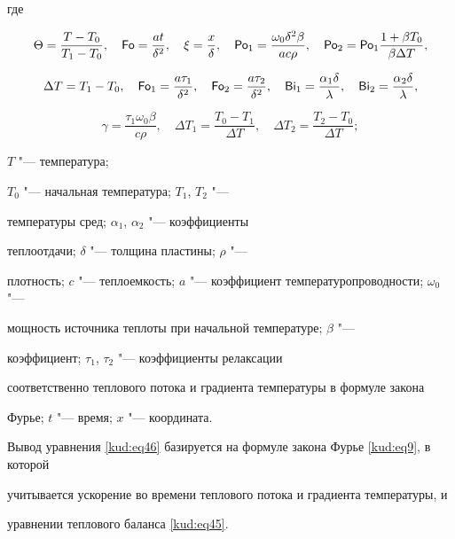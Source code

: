 где 

$$

\Theta =\frac{T-T_0 }{T_{1} -T_0}, \quad 

\operatorname{\sf Fo}=\frac{at}{\delta ^2}, \quad  

\xi =\frac{x}{\delta } , \quad 

{\sf  Po}_1 =\frac{\omega _0 \delta^2\beta }{ac\rho }, \quad  {\sf Po}_2 = {\sf Po}_1

\frac{1+\beta T_0 }{\beta \Delta T},$$

$$

\Delta T=T_{1} -T_0, \quad 

\operatorname{\sf Fo}_1 =\frac{a\tau _1 }{\delta ^2}, \quad 

\operatorname{\sf Fo}_2 =\frac{a\tau _2 }{\delta ^2}, \quad 

{\sf  Bi}_1 =\frac{\alpha_1 \delta }{\lambda }, \quad 

{\sf Bi}_2 =\frac{\alpha_2 \delta }{\lambda },$$ 

$$\gamma =\frac{\tau _1 \omega _0 \beta }{c\rho }, \quad \Delta T_1 =\frac{T_0 -T_{1}}{\Delta T}, 

\quad  \Delta T_2 =\frac{T_{2} -T_0 }{\Delta T};$$

$T$ "--- температура;

$T_0$ "--- начальная температура; $T_{1}$, $T_{2}$ "---

температуры сред; $\alpha_1$, $\alpha_2$ "--- коэффициенты

теплоотдачи; $\delta $ "--- толщина пластины; $\rho $ "---

плотность; $c$ "--- теплоемкость;  $a$ "--- коэффициент температуропроводности; $\omega_0$ "---

мощность источника теплоты при начальной температуре; $\beta $ "---

коэффициент; $\tau _1$, $\tau_2$ "--- коэффициенты релаксации

соответственно теплового потока и градиента температуры в формуле закона

Фурье; $t$ "--- время; $x$ "--- координата.



Вывод уравнения \eqref{kud:eq46} базируется на формуле закона Фурье \eqref{kud:eq9}, в которой

учитывается ускорение во времени теплового потока и градиента температуры, и

уравнении теплового баланса \eqref{kud:eq45}.



